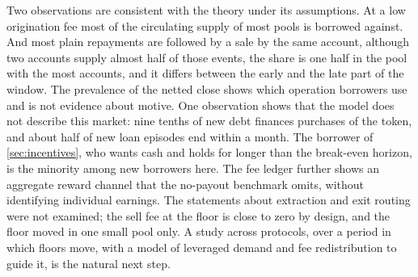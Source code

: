 Two observations are consistent with the theory under its assumptions. At a low origination fee most of the circulating supply of most pools is borrowed against. And most plain repayments are followed by a sale by the same account, although two accounts supply almost half of those events, the share is one half in the pool with the most accounts, and it differs between the early and the late part of the window. The prevalence of the netted close shows which operation borrowers use and is not evidence about motive. One observation shows that the model does not describe this market: nine tenths of new debt finances purchases of the token, and about half of new loan episodes end within a month. The borrower of \cref{sec:incentives}, who wants cash and holds for longer than the break-even horizon, is the minority among new borrowers here. The fee ledger further shows an aggregate reward channel that the no-payout benchmark omits, without identifying individual earnings. The statements about extraction and exit routing were not examined; the sell fee at the floor is close to zero by design, and the floor moved in one small pool only. A study across protocols, over a period in which floors move, with a model of leveraged demand and fee redistribution to guide it, is the natural next step.
